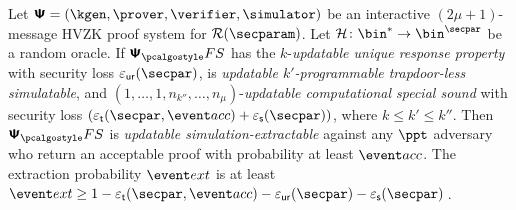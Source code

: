 
\begin{theorem}
	\label{thm:se}
	Let $\ps = (\kgen, \prover, \verifier, \simulator)$ be an interactive
	$(2 \mu + 1)$-message HVZK proof system for $\RELGEN(\secparam)$. Let
	$\ro \colon \bin^{*} \to \bin^{\secpar}$ be a random oracle. If $\psfs$ has the
	$k$-\emph{updatable unique response property} with security loss $\epsur(\secpar)$, is
	\emph{updatable $k'$-programmable trapdoor-less simulatable}, and $(1, \ldots, 1, n_{k''}, \ldots, n_\mu)$-\emph{updatable computational special sound} with security loss $(\epst (\secpar, \accProb) +  \epss(\secpar))$, where $k \leq k' \leq k''$. Then $\psfs$ is
	\emph{updatable simulation-extractable} against any $\ppt$ adversary who return an acceptable proof with probability at least $\accProb$.  The
	extraction probability $\extProb$ is at least
	$\extProb \geq 1 - \epst(\secpar, \accProb)
	- \epsur(\secpar) - \epss(\secpar)\,$.
\end{theorem}

